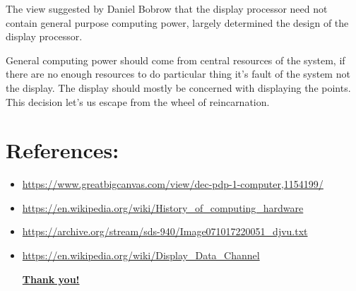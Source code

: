 \documentclass[11pt]{article}
\begin{document}
The view suggested by Daniel Bobrow that the display processor need
not contain general purpose computing power, largely determined the
design of the display processor.

General computing power should come from central resources of the
system, if there are no enough resources to do particular thing it's
fault of the system not the display. The display should mostly be concerned
with displaying the points. This decision let's us escape from
the wheel of reincarnation.
\section{References:}
\label{sec:orgd41ba6c}

\begin{itemize}
\item \url{https://www.greatbigcanvas.com/view/dec-pdp-1-computer,1154199/}
\item \url{https://en.wikipedia.org/wiki/History\_of\_computing\_hardware}
\item \url{https://archive.org/stream/sds-940/Image071017220051\_djvu.txt}
\item \url{https://en.wikipedia.org/wiki/Display\_Data\_Channel}

\textbf{\uline{Thank you!}}
\end{itemize}
\end{document}
